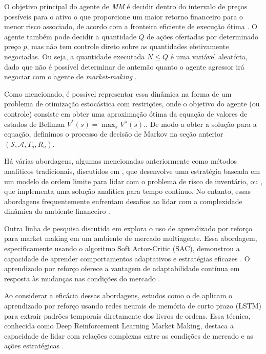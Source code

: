 O objetivo principal do agente de \textit{MM} é decidir dentro do intervalo de preços possíveis para o ativo o que proporcione um maior retorno financeiro para o menor risco associado, de acordo com a fronteira eficiente de execução ótima \citep{almgren2000}. O agente também pode decidir a quantidade $Q$ de ações ofertadas por determinado preço $p$, mas não tem controle direto sobre as quantidades efetivamente negociadas. Ou seja, a quantidade executada $N \leq Q$ é uma variável aleatória, dado que não é possível determinar de antemão quanto o agente agressor irá negociar com o agente de \textit{market-making} \citep{rao2020stochastic}.

Como mencionado, é possível representar essa dinâmica na forma de um problema de otimização estocástica com restrições, onde o objetivo do agente (ou controle) consiste em obter uma aproximação ótima da equação de valores de estados de Bellman $V^*(s) = \max_\pi V^{\pi}(s).$. De modo a obter a solução para a equação, definimos o processo de decisão de Markov na seção anterior $(\mathcal{S}, \mathcal{A}, T_{a}, R_{a})$. 

Há várias abordagens, algumas mencionadas anteriormente como métodos analíticos tradicionais, discutidos em \citep{Avellaneda2008}, que desenvolve uma estratégia baseada em um modelo de ordem limite para lidar com o problema de risco de inventário, ou \citep{rao2020stochastic}, que implementa uma solução analítica para tempo contínuo. No entanto, essas abordagens frequentemente enfrentam desafios ao lidar com a complexidade dinâmica do ambiente financeiro \citep{Gasperov2021}.

Outra linha de pesquisa discutida em \citep{Ganesh2019} explora o uso de aprendizado por reforço para market making em um ambiente de mercado multiagente. Essa abordagem, especificamente usando o algoritmo Soft Actor-Critic (SAC), demonstrou a capacidade de aprender comportamentos adaptativos e estratégias eficazes \citep{bakshaev2020}. O aprendizado por reforço oferece a vantagem de adaptabilidade contínua em resposta às mudanças nas condições do mercado \citep{Sutton2018}.

Ao considerar a eficácia dessas abordagens, estudos como o de \citep{WOS:000747190900001} aplicam o aprendizado por reforço usando redes neurais de memória de curto prazo (LSTM) para extrair padrões temporais diretamente dos livros de ordens. Essa técnica, conhecida como Deep Reinforcement Learning Market Making, destaca a capacidade de lidar com relações complexas entre as condições de mercado e as ações estratégicas \citep{WOS:000747190900001}.

